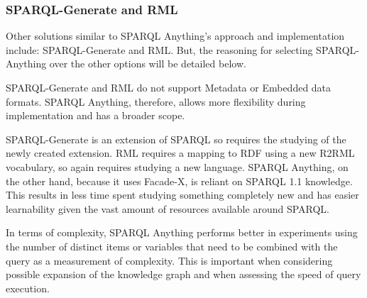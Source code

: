 \subsubsection{SPARQL-Generate and RML}
\hspace{0.5cm} Other solutions similar to SPARQL Anything's approach and implementation include: SPARQL-Generate and RML. But, the reasoning for selecting SPARQL-Anything over the other options will be detailed below.

SPARQL-Generate and RML do not support Metadata or Embedded data formats. \cite{sparqlanything} SPARQL Anything, therefore, allows more flexibility during implementation and has a broader scope. 

SPARQL-Generate is an extension of SPARQL so requires the studying of the newly created extension. RML requires a mapping to RDF using a new R2RML vocabulary, so again requires studying a new language. SPARQL Anything, on the other hand, because it uses Facade-X, is reliant on SPARQL 1.1 knowledge. \cite{sparqlanything} This results in less time spent studying something completely new and has easier learnability given the vast amount of resources available around SPARQL.

In terms of complexity, SPARQL Anything performs better in experiments using the number of distinct items or variables that need to be combined with the query as a measurement of complexity. \cite{sparqlanything} This is important when considering possible expansion of the knowledge graph and when assessing the speed of query execution. 